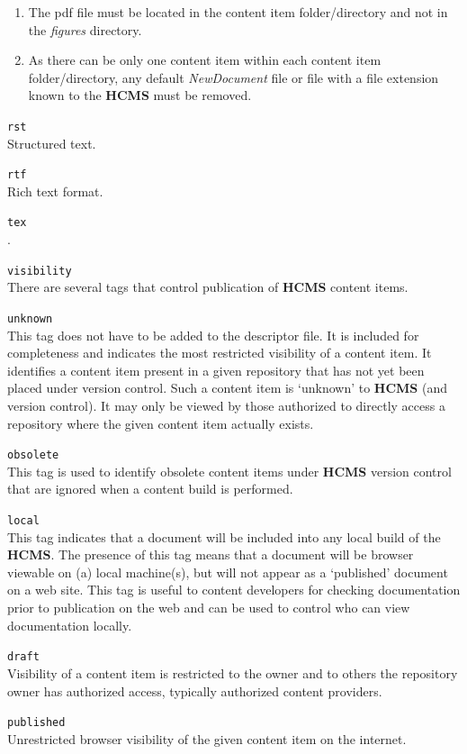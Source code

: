 \documentclass[12pt]{article}
\begin{document}
\begin{description}
\begin{description}
\begin{enumerate}
		\item The pdf file must be located in the content item folder/directory and not in the {\it figures} directory.
		\item As there can be only one content item within each content item folder/directory, any default {\it NewDocument} file or file with a file extension known to the {\bf \small HCMS} must be removed.
		\end{enumerate}
	\item {\tt rst}\\
 	Structured text.
	\item {\tt rtf}\\
	Rich text format.
	\item {\tt tex}\\
 	\LaTeXe.
	\end{description}
\item{\tt visibility}\\
There are several tags that control publication of {\bf \small HCMS} content items.
	\begin{description}
		\item {\tt unknown}\\
		This tag does not have to be added to the descriptor file. It is included for completeness and indicates the most restricted visibility of a content item. It  identifies a content item present in a given repository that has not yet been placed under version control. Such a content item is `unknown' to {\bf \small HCMS} (and version control). It may only be viewed by those authorized to directly access a repository where the given content item actually exists.
		\item {\tt obsolete}\\
		This tag is used to identify obsolete content items under {\bf \small HCMS} version control that are ignored when a content build is performed.
		\item {\tt local}\\
		This tag indicates that a document will be included into any local build of the {\bf \small HCMS}. The presence of this tag means that a document will be browser viewable on (a) local machine(s), but will not appear as a `published' document on a web site. This tag is useful to content developers for checking documentation prior to publication on the web and can be used to control who can view documentation locally.
		\item{\tt draft}\\
		Visibility of a content item is restricted to the owner and to others the repository owner has authorized access, typically authorized content providers.
		\item{\tt published}\\
		Unrestricted browser visibility of the given content item on the internet.
	\end{description}
\end{description}
\end{document}
